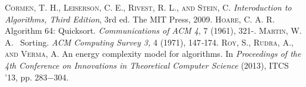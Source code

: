 \documentclass[10pt, twocolumn, a4paper]{article}
\let\ital\textit
\let\smca\textsc
\begin{document}
\begin{thebibliography}{25}
\smca{Cormen, T. H., Leiserson, C. E., Rivest, R. L., and Stein, C.} \ital{Interoduction to Algorithms, Third Edition}, 3rd ed. The MIT Press, 2009.
\smca{Hoare, C. A. R. }Algorithm 64: Quicksort. \ital{Communications of ACM 4}, 7 (1961), 321-.
\smca{Martin, W. A.} ~Sorting. \ital{ACM Computing Survey 3,} 4 (1971), 147\ital{-}174.
\smca{Roy, S., Rudra, A., and Verma, A.} An energy complexity model for algorithms. In \ital{Proceedings of the 4th Conference on Innovations in Theoretical Computer Science} (2013), ITCS '13, pp. 283$-$304.
\end{thebibliography}
\end{document}
